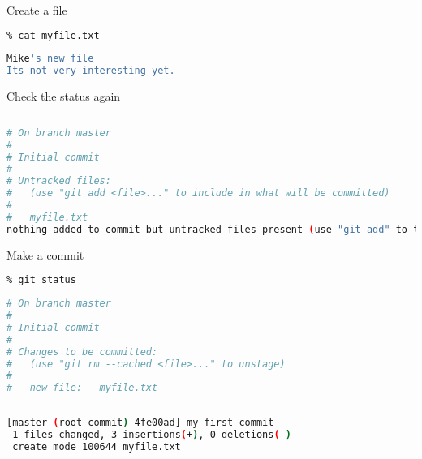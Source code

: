 \documentclass{beamer}
\begin{document}
\begin{frame}[fragile]
\begin{block}{Create a file}
\begin{lstlisting}[language=bash,basicstyle=\ttfamily\scriptsize]
% gedit myfile.txt
% cat myfile.txt
\end{lstlisting}

\begin{lstlisting}[language=bash,basicstyle=\sl\ttfamily\scriptsize]
Mike's new file
Its not very interesting yet.
\end{lstlisting}
\end{block}

\begin{block}{Check the status again}
\begin{lstlisting}[language=bash,basicstyle=\ttfamily\scriptsize]
% git status
\end{lstlisting}

\begin{lstlisting}[language=bash,basicstyle=\sl\ttfamily\scriptsize,breaklines=True]
# On branch master
#
# Initial commit
#
# Untracked files:
#   (use "git add <file>..." to include in what will be committed)
#
#	myfile.txt
nothing added to commit but untracked files present (use "git add" to track)
\end{lstlisting}
\end{block}
\end{frame}





\begin{frame}[fragile]
\begin{block}{Make a commit}
\begin{lstlisting}[language=bash,basicstyle=\ttfamily\scriptsize]
% git add myfile.txt
% git status
\end{lstlisting}

\begin{lstlisting}[language=bash,basicstyle=\sl\ttfamily\scriptsize,breaklines=True]
# On branch master
#
# Initial commit
#
# Changes to be committed:
#   (use "git rm --cached <file>..." to unstage)
#
#	new file:   myfile.txt
\end{lstlisting}


\begin{lstlisting}[language=bash,basicstyle=\ttfamily\scriptsize]
% git commit -m 'my first commit'
\end{lstlisting}

\begin{lstlisting}[language=bash,basicstyle=\sl\ttfamily\scriptsize,breaklines=True]
[master (root-commit) 4fe00ad] my first commit
 1 files changed, 3 insertions(+), 0 deletions(-)
 create mode 100644 myfile.txt
\end{lstlisting}

\end{block}
\end{frame}
\end{document}
